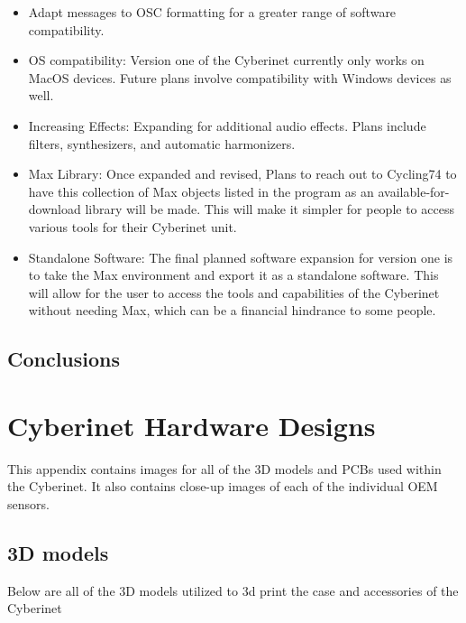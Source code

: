 \begin{itemize}
    \item Adapt messages to OSC formatting for a greater range of software compatibility.
    \item OS compatibility: Version one of  the Cyberinet currently only works on MacOS devices. Future plans involve compatibility with Windows devices as well.
    \item Increasing Effects: Expanding for additional audio effects. Plans include filters, synthesizers, and automatic harmonizers.
    \item Max Library: Once expanded and revised, Plans to reach out to Cycling74 to have this collection of Max objects listed in the program as an available-for-download library will be made. This will make it simpler for people to access various tools for their Cyberinet unit.
    \item Standalone Software: The final planned software expansion for version one is to take the Max environment and export it as a standalone software. This will allow for the user to access the tools and capabilities of the Cyberinet without needing Max, which can be a financial hindrance to some people.
\end{itemize}

\section{Conclusions}




\appendix

\chapter{Cyberinet Hardware Designs}
This appendix contains images for all of the 3D models and PCBs used within the Cyberinet. It also contains close-up images of each of the individual OEM sensors.

\section{3D models}
Below are all of the 3D models utilized to 3d print the case and accessories of the Cyberinet

